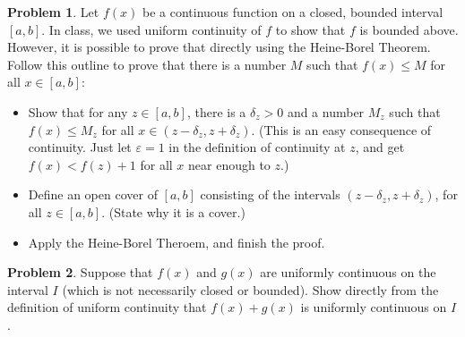 \documentclass[12pt]{article}
\newcommand{\eps}{\varepsilon}
\theoremstyle{definition}
\newtheorem{problem}{Problem}
\newenvironment{answer}{\par\medskip\bgroup\color{darkblue}}{\egroup\par\medskip}
\begin{document}
 



\begin{problem}  %
Let $f(x)$ be a continuous function on a closed, bounded interval $[a,b]$.
In class, we used uniform continuity of $f$ to show that $f$ is bounded above.
However, it is possible to prove that directly using the Heine-Borel Theorem.
Follow this outline to prove that there is a number $M$ such that $f(x)\le M$ for
all $x\in[a,b]$:
\begin{itemize}
\item Show that for any $z\in[a,b]$, there is a $\delta_z>0$ and
a number $M_z$ such that $f(x)\le M_z$ for all $x\in(z-\delta_z,z+\delta_z)$.
(This is an easy consequence of continuity.  Just let $\eps=1$ in the definition
of continuity at $z$, and get $f(x)<f(z)+1$ for all $x$ near enough to $z$.)
\item Define an open cover of $[a,b]$ consisting of the
intervals $(z-\delta_z,z+\delta_z)$, for all $z\in[a,b]$.
(State why it is a cover.)
\item Apply the Heine-Borel Theroem, and finish the proof.
\end{itemize}
\end{problem}

\begin{answer}
\end{answer}






\begin{problem}  %
Suppose that $f(x)$ and $g(x)$ are uniformly continuous
on the interval $I$ (which is not necessarily closed or bounded).
Show directly from the definition of uniform continuity that $f(x)+g(x)$ is
uniformly continuous on $I$.
\end{problem}

\begin{answer}
\end{answer}
\end{document}
